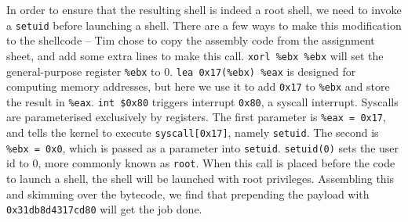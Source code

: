 In order to ensure that the resulting shell is indeed a root shell, we need to invoke a {\tt setuid} before launching a shell. There are a few ways to make this modification to the shellcode -- Tim chose to copy the assembly code from the assignment sheet, and add some extra lines to make this call. {\tt xorl \%ebx \%ebx} will set the general-purpose register {\tt \%ebx} to 0. {\tt lea 0x17(\%ebx) \%eax} is designed for computing memory addresses, but here we use it to add {\tt 0x17} to {\tt \%ebx} and store the result in {\tt \%eax}. {\tt int \$0x80} triggers interrupt {\tt 0x80}, a syscall interrupt. Syscalls are parameterised exclusively by registers.%
The first parameter is {\tt \%eax = 0x17}, and tells the kernel to execute {\tt syscall[0x17]}, namely {\tt setuid}. The
second is {\tt \%ebx = 0x0}, which is passed as a parameter into {\tt setuid}. {\tt setuid(0)} sets the user id to 0,
more commonly known as {\tt root}. When this call is placed before the code to launch a shell, the shell will be
launched with root privileges. Assembling this and skimming over the bytecode, we find that prepending the payload with {\tt 0x31db8d4317cd80} will get the job done.
